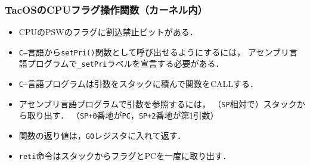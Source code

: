 \documentclass[unicode,handout]{beamer}                   %
\begin{document}
\begin{frame}
  \frametitle{TacOSのCPUフラグ操作関数（カーネル内）}
  \begin{itemize}
  \item CPUのPSWのフラグに割込禁止ビットがある．
  \item {\tt C--}言語から{\tt setPri()}関数として呼び出せるようにするには，
    アセンブリ言語プログラムで{\tt \_setPri}ラベルを宣言する必要がある．
  \item {\tt C--}言語プログラムは引数をスタックに積んで関数をCALLする．
  \item アセンブリ言語プログラムで引数を参照するには，
    （{\tt SP}相対で）スタックから取り出す．
    （{\tt SP+0}番地が{\tt PC}，{\tt SP+2}番地が第1引数）
  \item 関数の返り値は，{\tt G0}レジスタに入れて返す．
  \item {\tt reti}命令はスタックからフラグとPCを一度に取り出す．
  \end{itemize}
\end{frame}
\end{document}
